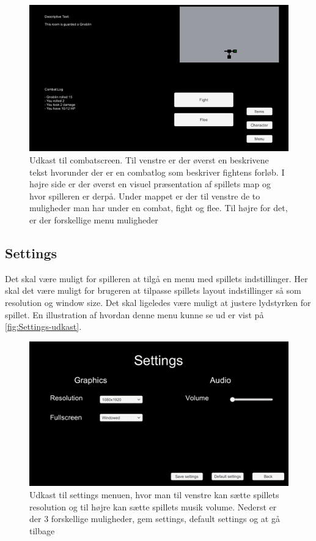 \begin{figure}[H]
\centering
\includegraphics[width = \textwidth]{02-Body/Images/CombatScreen-udkast.png}
\caption{Udkast til combatscreen. Til venstre er der øverst en beskrivene tekst hvorunder der er en combatlog som beskriver fightens forløb. I højre side er der øverst en visuel præsentation af spillets map og hvor spilleren er derpå. Under mappet er der til venstre de to muligheder man har under en combat, fight og flee. Til højre for det, er der forskellige menu muligheder}
\label{fig:Combat-udkast}
\end{figure}

\subsection{Settings}
Det skal være muligt for spilleren at tilgå en menu med spillets indstillinger. Her skal det være muligt for brugeren at tilpasse spillets layout indstillinger så som resolution og window size. Det skal ligeledes være muligt at justere lydstyrken for spillet. En illustration af hvordan denne menu kunne se ud er vist på \autoref{fig:Settings-udkast}.

\begin{figure}[H]
\centering
\includegraphics[width = \textwidth]{02-Body/Images/SettingsMenu-udkast.png}
\caption{Udkast til settings menuen, hvor man til venstre kan sætte spillets resolution og til højre kan sætte spillets musik volume.
Nederst er der 3 forskellige muligheder, gem settings, default settings og at gå tilbage}
\label{fig:Settings-udkast}
\end{figure}
